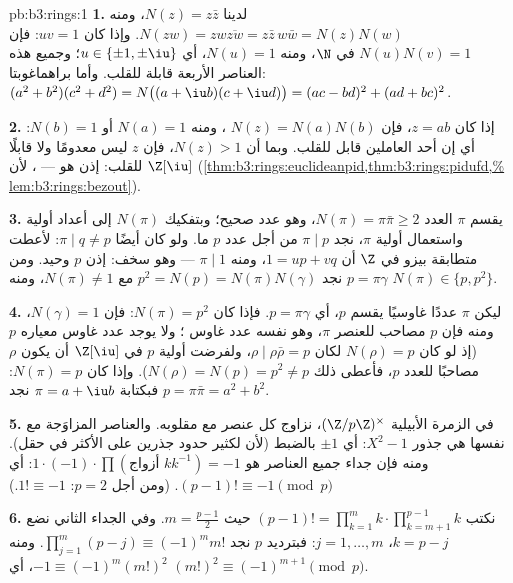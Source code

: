 \begin{solution}{pb:b3:rings:1}
\textbf{1.} لدينا $N(z) = z\bar z$، ومنه $N(zw) = zw\overline{zw} = z\bar
z\, w \bar w = N(z)N(w)$. وإذا كان
$uv = 1$: فإن $N(u)N(v) = 1$ في $\N$، ومنه $N(u) = 1$، أي
$u \in \{\pm 1, \pm \iu\}$؛ وجميع هذه العناصر الأربعة قابلة للقلب. وأما
براهماغوبتا: $(a^2+b^2)(c^2+d^2) = N\bigl((a + \iu b)(c + \iu
d)\bigr) = (ac - bd)^2 + (ad + bc)^2$.

\textbf{2.} إذا كان $z = ab$، فإن $N(z) = N(a)N(b)$ ، ومنه $N(a) = 1$
أو $N(b) = 1$: أي إن أحد العاملين قابل للقلب. وبما أن
$N(z) > 1$، فإن $z$ ليس معدومًا ولا قابلًا للقلب: إذن هو  --- ، لأن $\Z[\iu]$ 
(\cref{thm:b3:rings:euclideanpid,thm:b3:rings:pidufd,%
lem:b3:rings:bezout}).

\textbf{3.} يقسم $\pi$ العدد $N(\pi) = \pi\bar\pi \geq 2$، وهو عدد صحيح؛ وبتفكيك
$N(\pi)$ إلى أعداد أولية واستعمال أولية $\pi$، نجد $\pi \mid p$
من أجل عدد  $p$ ما. ولو كان أيضًا $\pi \mid q \neq p$: لأعطت متطابقة
بيزو في $\Z$ أن $1 = up + vq$، ومنه $\pi \mid 1$ --- وهو سخف:
إذن $p$ وحيد. ومن $p = \pi\gamma$ نجد $p^2 = N(p) = N(\pi)N(\gamma)$ مع
$N(\pi) \neq 1$، ومنه $N(\pi)
\in \{p, p^2\}$.

\textbf{4.} ليكن $\pi$ عددًا غاوسيًا  يقسم $p$، أي $p =
\pi\gamma$.
فإذا كان $N(\pi) = p^2$: فإن $N(\gamma) = 1$، ومنه فإن $p$
مصاحب للعنصر $\pi$، وهو نفسه عدد غاوس ؛ ولا يوجد عدد غاوس 
معياره $p$ (إذ لو كان $N(\rho) = p$ لكان $\rho \mid
\rho\bar\rho = p$، ولفرضت أولية
$p$ في $\Z[\iu]$ أن يكون $\rho$ مصاحبًا للعدد $p$، فأعطى ذلك
$N(\rho) = N(p) = p^2 \neq
p$). وإذا كان $N(\pi) = p$: فبكتابة $\pi = a + \iu b$ نجد $p = \pi\bar\pi = a^2
+ b^2$.

\textbf{5.} في الزمرة الأبيلية $(\Z/p\Z)^\times$، نزاوج كل عنصر مع
مقلوبه. والعناصر المزاوَجة مع نفسها هي جذور $X^2 - 1$: أي
$\pm 1$ بالضبط (لأن لكثير حدود جذرين على الأكثر في حقل). ومنه
فإن جداء جميع العناصر هو $1 \cdot (-1) \cdot \prod
(\text{أزواج } k k^{-1}) = -1$: أي $(p-1)! \equiv -1 \pmod p$. (ومن أجل $p = 2$:
$1! \equiv -1$.)

\textbf{6.} نكتب $(p-1)! = \prod_{k=1}^m k \cdot
\prod_{k=m+1}^{p-1}k$ حيث $m = \frac{p-1}2$. وفي الجداء الثاني نضع
$k = p - j$، $j = 1, \dots, m$: فبترديد $p$ نجد $\prod_{j=1}^m (p - j) \equiv (-1)^m m!$. ومنه $-1 \equiv
(-1)^m (m!)^2$،
أي $(m!)^2 \equiv (-1)^{m+1} \pmod p$.


\end{solution}

